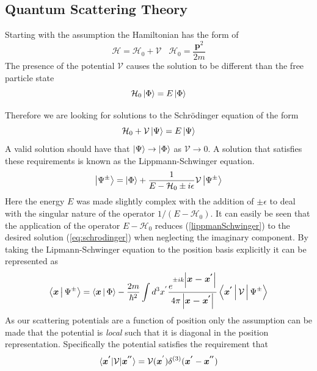 \subsection{Quantum Scattering Theory}
\label{sec:scatteringTheory}
 Starting with the assumption the Hamiltonian has the form of 
 \begin{equation}
 \mathcal{H} = \mathcal{H}_0+\mathcal{V} \,\,\,\,\, \mathcal{H}_0= \frac{\textbf{p}^2}{2m}
 \label{eq:hamiltonian}
 \end{equation}
The presence of the potential $\mathcal{V}$ causes the solution to be different than the free particle state 
$$\mathcal{H}_0\Ket{\Phi}=E\Ket{\Phi}$$

Therefore we are looking for solutions to the Schrödinger equation of the form \cite{sakurai}
\begin{equation}
\label{eq:schrodinger}
\mathcal{H}_0+\mathcal{V}\Ket{\Psi} = E\Ket{\Psi} 
\end{equation} 
 A valid solution should have that $\Ket{\Psi}\rightarrow\Ket{\Phi}$ as $\mathcal{V}\rightarrow 0$. A solution that satisfies these requirements is known as the Lippmann-Schwinger equation. \cite{sakurai}
 \begin{equation}
 	\label{lippmanSchwinger}
 	\Ket{\Psi^{\pm}}=\Ket{\Phi}+\frac{1}{E-\mathcal{H}_0\pm i\epsilon}\mathcal{V}\Ket{\Psi^{\pm}} 
 \end{equation}
 Here the energy $E$ was made slightly complex with the addition of $\pm \epsilon$ to deal with the singular nature of the operator $1/(E-\mathcal{H}_0)$. It can easily be seen that the application of the operator $E-\mathcal{H}_0$ reduces (\ref{lippmanSchwinger}) to the desired solution (\ref{eq:schrodinger}) when neglecting the imaginary component. By taking the Lipmann-Schwinger equation to the position basis explicitly it can be represented as \cite{sakurai}
 \begin{equation}
 \label{eq:positionBasis}
 \Braket{\mbox{\boldmath$x$}|\Psi^{\pm}}=\Braket{\mbox{\boldmath$x$}|\Phi} -\frac{2m}{\hbar^2} \int d^3x^{'} \frac{e^{\pm ik\left|\mbox{\boldmath$x-x^{'}$}\right|}}{ 4\pi \left| \mbox{\boldmath$x-x^{'}$} \right|} \Braket{\mbox{\boldmath$x^{'}$}|\mathcal{V}|\Psi^{\pm}}
 \end{equation}
As our scattering potentials are a function of position only the assumption can be made that the potential is \textit{local} such that it is diagonal in the position representation. Specifically the potential satisfies the requirement that \cite{sakurai}
\begin{equation}
\label{eq:localPotential}
\braket{\mbox{\boldmath$x^{'}$}|\mathcal{V}|\mbox{\boldmath$x^{''}$}}=\mathcal{V}(\mbox{\boldmath$x$}^{'})\delta^{(3)}(\mbox{\boldmath$x^{'}$}-\mbox{\boldmath$x^{''}$})
\end{equation}

